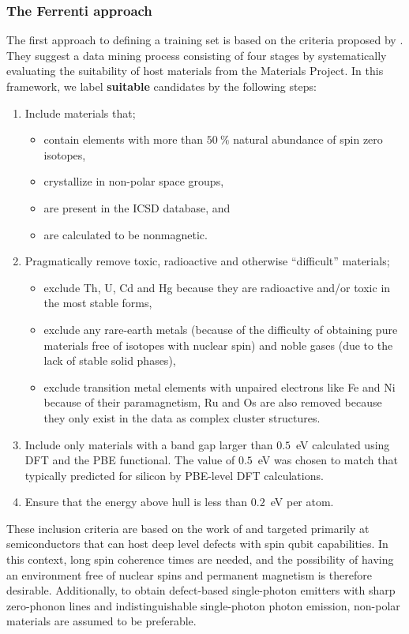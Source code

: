 \documentclass[superscriptaddress,unsortedaddress,
 amsmath,amssymb,
 aps,
]{revtex4-2}
\begin{document}
\subsubsection*{The Ferrenti approach}
The first approach to defining a training set is based on the criteria proposed by \citeauthor{Ferrenti2020} \cite{Ferrenti2020}.
They suggest a data mining process consisting of four stages by systematically evaluating the suitability of host materials from the Materials Project. In this framework, we label \textbf{suitable} candidates by the following steps: 
\begin{enumerate}
    \item Include materials that;
    \begin{itemize}
        \item contain elements with more than $50 \ \%$ natural abundance of spin zero isotopes,
        \item crystallize in non-polar space groups,
        \item are present in the ICSD database, 
        and
        \item are calculated to be nonmagnetic. 
    \end{itemize}
    \item Pragmatically remove toxic, radioactive and otherwise ``difficult'' materials;
    \begin{itemize}
        \item exclude Th, U, Cd and Hg because they are radioactive and/or toxic in the most stable forms,
        \item exclude any rare-earth metals (because of the difficulty of obtaining pure materials free of isotopes with nuclear spin) and noble gases (due to the lack of stable solid phases),
        \item exclude transition metal elements with unpaired electrons like Fe and Ni because of their paramagnetism, Ru and Os are also removed because they only exist in the data as complex cluster structures. 
    \end{itemize}
    \item Include only materials with a band gap larger than $0.5$~eV calculated using DFT and the PBE functional. The value of $0.5$~eV was chosen to match that typically predicted for silicon by PBE-level DFT calculations. 
    \item Ensure that the energy above hull is less than $0.2$~eV per atom.
\end{enumerate}

These inclusion criteria are based on the work of \citeauthor{Weber2010} \cite{Weber2010} and targeted primarily at semiconductors that can host deep level defects with spin qubit capabilities. In this context, long spin coherence times are needed, and the possibility of having an environment free of nuclear spins and permanent magnetism is therefore desirable. Additionally, to obtain defect-based single-photon emitters with sharp zero-phonon lines and indistinguishable single-photon photon emission, non-polar materials are assumed to be preferable. 
\end{document}
